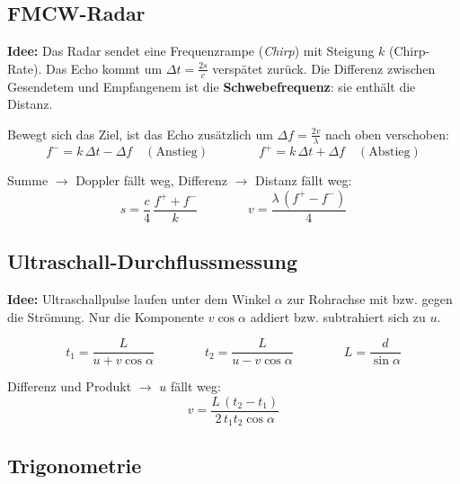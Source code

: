 \subsection{FMCW-Radar}\label{FMCW}

\textbf{Idee:} Das Radar sendet eine Frequenzrampe (\emph{Chirp}) mit Steigung $k$ (Chirp-Rate). Das Echo kommt um $\Delta t = \frac{2s}{c}$ verspätet zurück. Die Differenz zwischen Gesendetem und Empfangenem ist die \textbf{Schwebefrequenz}: sie enthält die Distanz.

\medskip

Bewegt sich das Ziel, ist das Echo zusätzlich um $\Delta f = \frac{2v}{\lambda}$ nach oben verschoben:
$$ f^{-} = k\,\Delta t - \Delta f \quad (\text{Anstieg}) \qquad\qquad f^{+} = k\,\Delta t + \Delta f \quad (\text{Abstieg}) $$

\centerline{\resizebox{0.95\columnwidth}{!}{}}

\medskip

Summe $\rightarrow$ Doppler fällt weg, Differenz $\rightarrow$ Distanz fällt weg:
$$ \boxed{ s = \frac{c}{4}\,\frac{f^{+} + f^{-}}{k} } \qquad\qquad \boxed{ v = \frac{\lambda\,(f^{+} - f^{-})}{4} } $$


\subsection{Ultraschall-Durchflussmessung}

\textbf{Idee:} Ultraschallpulse laufen unter dem Winkel $\alpha$ zur Rohrachse mit bzw. gegen die Strömung. Nur die Komponente $v\cos\alpha$ addiert bzw. subtrahiert sich zu $u$.

\centerline{\resizebox{0.7\columnwidth}{!}{}}

$$ t_1 = \frac{L}{u + v\cos\alpha} \qquad\qquad t_2 = \frac{L}{u - v\cos\alpha} \qquad\qquad L = \frac{d}{\sin\alpha} $$

Differenz und Produkt $\rightarrow$ $u$ fällt weg:
$$ \boxed{ v = \frac{L\,(t_2 - t_1)}{2\,t_1 t_2 \cos\alpha} } $$


\subsection{Trigonometrie}

